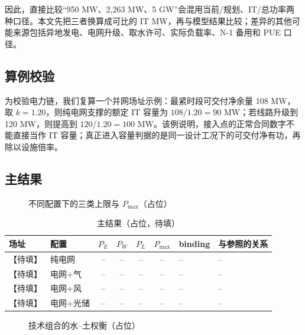 \documentclass{mcmthesis}
\begin{document}
因此，直接比较“950 MW、2,263 MW、5 GW”会混用当前/规划、IT/总功率两种口径。本文先把三者换算成可比的 IT MW，再与模型结果比较；差异的其他可能来源包括异地发电、电网升级、取水许可、实际负载率、N-1 备用和 PUE 口径。

\subsection{算例校验}

为校验电力链，我们复算一个并网场址示例：最紧时段可交付净余量 108 MW，取 \(k=1.20\)，则纯电网支撑的额定 IT 容量为 \(108/1.20=90\) MW；若线路升级到 120 MW，则提高到 \(120/1.20=100\) MW。该例说明，接入点的正常合同数字不能直接当作 IT 容量；真正进入容量判据的是同一设计工况下的可交付净有功，再除以设施倍率。

\subsection{主结果}

\begin{figure}[H]
\centering
{}
\caption{不同配置下的三类上限与 \(P_{\max}\)（占位）}
\label{fig:main}
\end{figure}

\begin{table}[H]
\centering
\caption{主结果（占位，待填）}
\label{tab:main}
\small
\begin{tabularx}{\textwidth}{@{}l l c c c c l X@{}}
\toprule
场址 & 配置 & \(P_E\) & \(P_W\) & \(P_L\) & \(P_{\max}\) & binding & 与参照的关系 \\
\midrule
【待填】 & 纯电网 & -- & -- & -- & -- & -- & -- \\
【待填】 & 电网+气 & -- & -- & -- & -- & -- & -- \\
【待填】 & 电网+风 & -- & -- & -- & -- & -- & -- \\
【待填】 & 电网+光储 & -- & -- & -- & -- & -- & -- \\
\bottomrule
\end{tabularx}
\end{table}

\begin{figure}[H]
\centering
{}
\caption{技术组合的水--土权衡（占位）}
\label{fig:tradeoff}
\end{figure}
\end{document}

